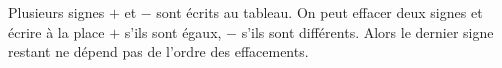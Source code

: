 Plusieurs signes $+$ et $-$ sont écrits au tableau. On peut effacer deux signes et écrire à la place $+$ s'ils sont égaux, $-$ s'ils sont différents. Alors le dernier signe restant ne dépend pas de l'ordre des effacements.
